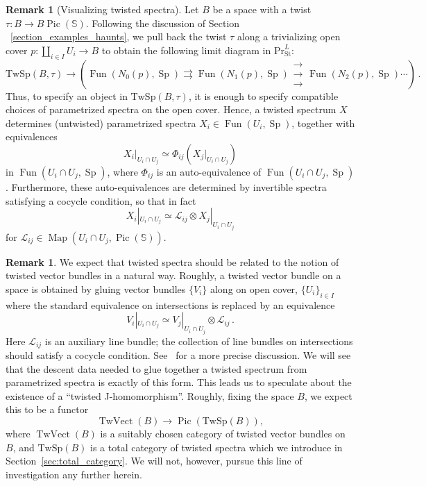 \documentclass[10pt]{amsart}
\theoremstyle{plain}
\theoremstyle{definition}
\newtheorem{rmk}[theorem]{Remark}
\DeclareMathOperator{\Sp}{Sp}
\DeclareMathOperator{\Fun}{Fun}
\DeclareMathOperator{\Pic}{Pic}
\def\on{\operatorname}
\DeclareMathOperator{\Map}{Map}
\newcommand{\St}{\mathrm{St}}
\newcommand{\bS}{\mathbb{S}}
\newcommand{\TwSp}{\mathrm{TwSp}}
\begin{document}
\begin{rmk}[Visualizing twisted spectra]
Let $B$ be a space with a twist $\tau: B \to B \Pic(\bS)$.
Following the discussion of Section ~\ref{section_examples_haunts}, we pull back the twist $\tau$ along a trivializing open cover $p: \coprod_{i \in I} U_i \to B$ to obtain the following limit diagram in $\mathrm{Pr}^{L}_{\St}$:
\begin{equation} \label{big_kahuna}
\TwSp(B, \tau) \to \left(\Fun(N_{0}(p), \Sp) \rightrightarrows \Fun(N_{1}(p), \Sp) \substack{\rightarrow\\[-1em] \rightarrow \\[-1em] \rightarrow} \Fun(N_{2}(p), \Sp) \cdots \right) \,.
\end{equation}
Thus, to specify an object in $\TwSp(B, \tau)$, it is enough to specify compatible choices of parametrized spectra on the open cover.
Hence, a twisted spectrum $X$ determines (untwisted) parametrized spectra $X_i \in \Fun(U_i, \Sp)$, together with equivalences
\begin{equation}
X_i|_{U_i \cap U_j} \simeq  \Phi_{ij}(X_j|_{U_i \cap U_j})
\end{equation}
in $\Fun(U_i \cap U_j, \Sp)$, where $\Phi_{ij}$ is an auto-equivalence of $\Fun(U_i \cap U_j, \Sp)$.
Furthermore, these auto-equivalences are determined by invertible spectra satisfying a cocycle condition, so that in fact
$$
X_i|_{U_i \cap U_j} \simeq  \mathcal{L}_{ij} \otimes X_j|_{U_i \cap U_j}
$$
for $\mathcal{L}_{ij} \in \Map(U_i \cap U_j, \Pic(\bS))$.
\end{rmk}

\begin{rmk}
We expect that twisted spectra should be related to the notion of twisted vector bundles in a natural way.
Roughly, a twisted vector bundle on a space is obtained by gluing vector bundles $\{V_i\}$ along on open cover, $\{ U_i\}_{i \in I}$ where the standard equivalence on intersections is replaced by an equivalence
\[
V_i|_{U_i \cap U_j} \simeq V_{j}|_{U_i \cap U_j}  \otimes \mathcal{L}_{ij} \,.
\]
Here $\mathcal{L}_{ij}$ is an auxiliary line bundle; the collection of line bundles on intersections should satisfy a cocycle condition. See~\cite[Section 1]{freedhopkinsteleman} for a more precise discussion.
We will see that the descent data needed to glue together a twisted spectrum from parametrized spectra is exactly of this form. This leads us to speculate about the existence of a ``twisted J-homomorphism''.
Roughly, fixing the space $B$, we expect this to be a functor
\[
\on{TwVect}(B) \to \Pic(\TwSp(B)),
\]
where $\on{TwVect}(B)$ is a suitably chosen category of twisted vector bundles on $B$, and $\TwSp(B)$ is a total category of twisted spectra which we introduce in Section~\ref{sec:total_category}.
We will not, however, pursue this line of investigation any further herein.
\end{rmk}
\end{document}
